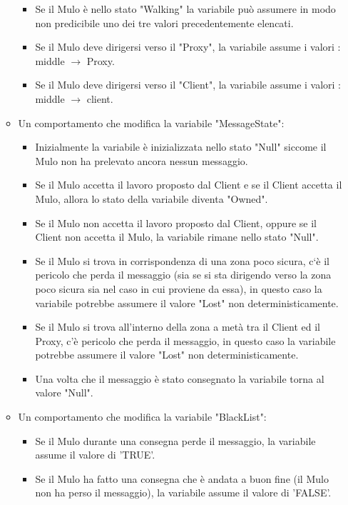 \documentclass[13pt,a4paper]{article}
\begin{document}
\begin{itemize}
\begin{itemize}
		\begin{itemize}
			\item Se il Mulo è nello stato "Walking" la variabile può assumere in modo non predicibile uno dei tre valori precedentemente elencati. 
			\item Se il Mulo deve dirigersi verso il "Proxy", la variabile assume i valori : middle $\rightarrow$ Proxy.
			\item Se il Mulo deve dirigersi verso il "Client", la variabile assume i valori : middle $\rightarrow$ client.
		\end{itemize}
	\item Un comportamento che modifica la variabile "MessageState":
	\begin{itemize}
		\item Inizialmente la variabile è inizializzata nello stato "Null" siccome il Mulo non ha prelevato ancora nessun messaggio.
		\item Se il Mulo accetta il lavoro proposto dal Client e se il Client  accetta il Mulo, allora lo stato della variabile diventa "Owned".
		\item Se il Mulo non accetta il lavoro proposto dal Client, oppure se il Client non accetta il Mulo,  la variabile rimane nello stato "Null".
		\item Se il Mulo si trova in corrispondenza di una zona poco sicura, c`è il pericolo che  perda il messaggio (sia se si sta dirigendo verso la zona poco sicura  sia nel caso in cui proviene da essa), in questo caso la variabile potrebbe assumere il valore "Lost" non deterministicamente.
		\item Se il Mulo si trova all'interno della zona a metà tra il Client ed il Proxy, c'è pericolo che perda il messaggio, in questo caso la variabile potrebbe assumere il valore "Lost" non deterministicamente.
		\item Una volta che il messaggio è stato consegnato la variabile torna al valore "Null".
	\end{itemize}
	\item Un comportamento che modifica la variabile "BlackList":
	\begin{itemize}
		\item Se il Mulo durante una consegna perde il messaggio, la variabile assume il valore di 'TRUE'.
		\item Se il Mulo ha fatto una consegna che è andata a buon fine (il Mulo non ha perso il messaggio), la variabile assume il valore di 'FALSE'.
	\end{itemize} 

\end{itemize}
\end{itemize}
\end{document}
